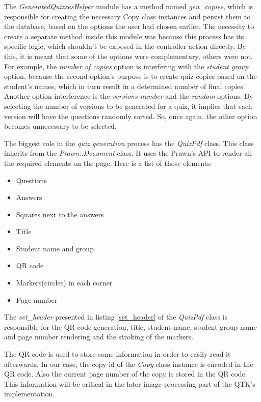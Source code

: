 The \textit{GeneratedQuizzesHelper} module has a method named \textit{gen\_copies}, which is responsible for creating the necessary Copy class instances and persist them to the database, based on the options the user had chosen earlier. The necessity to create a separate method inside this module was because this process has its specific logic, which shouldn't be exposed in the controller action directly. By this, it is meant that some of the options were complementary, others were not. For example, the \textit{number of copies} option is interfering with the \textit{student group} option, because the second option's purpose is to create quiz copies based on the student's names, which in turn result in a determined number of final copies. Another option interference is the \textit{versions number} and the \textit{random} options. By selecting the number of versions to be generated for a quiz, it implies that each version will have the questions randomly sorted. So, once again, the other option becomes unnecessary to be selected.

The biggest role in the \textit{quiz generation} process has the \textit{QuizPdf} class. This class inherits from the \textit{Prawn::Document} class. It uses the Prawn's API to render all the required elements on the page. Here is a list of those elements: 
\begin{itemize}
  \item Questions
  \item Answers
  \item Squares next to the answers
  \item Title
  \item Student name and group
  \item QR code
  \item Markers(circles) in each corner
  \item Page number
\end{itemize}

The \textit{set\_header} presented in listing \ref{set_header} of the \textit{QuizPdf} class is responsible for the QR code generation, title, student name, student group name and page number rendering and the stroking of the markers. 

The QR code is used to store some information in order to easily read it afterwards. In our case, the copy id of the \textit{Copy} class instance 
is encoded in the QR code. Also the current page number of the copy is stored in the QR code. This information will be critical in the later image processing part of the QTK's implementation. 

